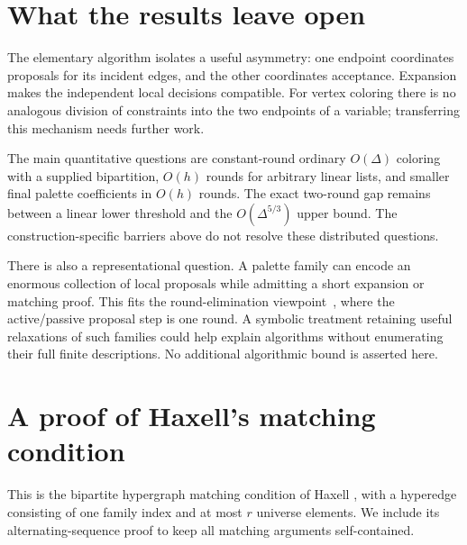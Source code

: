 \documentclass[11pt]{article}
\theoremstyle{definition}
\theoremstyle{remark}
\begin{document}
\section{What the results leave open}
The elementary algorithm isolates a useful asymmetry: one endpoint
coordinates proposals for its incident edges, and the other coordinates
acceptance. Expansion makes the independent local decisions compatible.
For vertex coloring there is no analogous division of constraints into
the two endpoints of a variable; transferring this mechanism needs
further work.

The main quantitative questions are constant-round ordinary $O(\Delta)$
coloring with a supplied bipartition, $O(h)$ rounds for arbitrary linear
lists, and smaller final palette coefficients in $O(h)$ rounds.
The exact two-round gap remains between a linear lower threshold and
the $O(\Delta^{5/3})$ upper bound. The construction-specific barriers
above do not resolve these distributed questions.

There is also a representational question. A palette family can encode
an enormous collection of local proposals while admitting a short
expansion or matching proof. This fits the round-elimination
viewpoint~\cite{Brandt}, where the active/passive proposal step is one
round. A symbolic treatment retaining useful relaxations of such families
could help explain algorithms without enumerating their full finite
descriptions. No additional algorithmic bound is asserted here.

\appendix



\section{A proof of Haxell's matching condition}\label{app:haxell}
This is the bipartite hypergraph matching condition of Haxell
\cite{Haxell,Annamalai}, with a hyperedge consisting of one family index and
at most $r$ universe elements.  We include its alternating-sequence
proof to keep all matching arguments self-contained.
\end{document}
